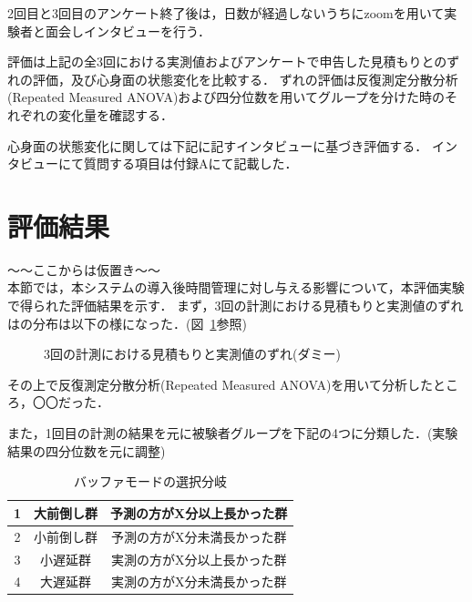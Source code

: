 2回目と3回目のアンケート終了後は，日数が経過しないうちにzoom\cite{zoom}を用いて実験者と面会しインタビューを行う．

評価は上記の全3回における実測値およびアンケートで申告した見積もりとのずれの評価，及び心身面の状態変化を比較する．
ずれの評価は反復測定分散分析(Repeated Measured ANOVA)および四分位数を用いてグループを分けた時のそれぞれの変化量を確認する．

心身面の状態変化に関しては下記に記すインタビューに基づき評価する．
インタビューにて質問する項目は付録Aにて記載した．%

\section{評価結果}
〜〜ここからは仮置き〜〜\\
本節では，本システムの導入後時間管理に対し与える影響について，本評価実験で得られた評価結果を示す．
まず，3回の計測における見積もりと実測値のずれはの分布は以下の様になった．(図~\ref{fig:hakohige}参照)

\begin{figure}[hb]
	\begin{center}
	\caption{3回の計測における見積もりと実測値のずれ(ダミー)}
	\label{fig:hakohige}
	\end{center}
\end{figure}

その上で反復測定分散分析(Repeated Measured ANOVA)を用いて分析したところ，〇〇だった．

また，1回目の計測の結果を元に被験者グループを下記の4つに分類した．(実験結果の四分位数を元に調整)

\begin{table}[htb]
  \begin{center}
  \begin{tabular}{|c|c|c|} \hline
    1 & 大前倒し群 & 予測の方がX分以上長かった群  \\ \hline
    2 & 小前倒し群 & 予測の方がX分未満長かった群  \\ \hline
    3 & 小遅延群 & 実測の方がX分以上長かった群  \\ \hline
    4 & 大遅延群 & 実測の方がX分未満長かった群  \\ \hline 
  \end{tabular}
    \caption{バッファモードの選択分岐}
    \label{tb:buffer}
  \end{center}
\end{table}

